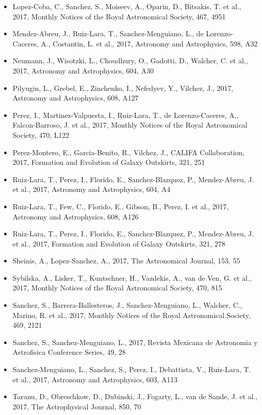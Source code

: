\documentclass{letter}
\begin{document}
\begin{enumerate}
\begin{itemize}
\item Lopez-Coba, C., Sanchez, S., Moiseev, A., Oparin, D., Bitsakis, T. et al., 2017, Monthly Notices of the Royal Astronomical Society, 467, 4951
\item Mendez-Abreu, J., Ruiz-Lara, T., Sanchez-Menguiano, L., de Lorenzo-Caceres, A., Costantin, L. et al., 2017, Astronomy and Astrophysics, 598, A32
\item Neumann, J., Wisotzki, L., Choudhury, O., Gadotti, D., Walcher, C. et al., 2017, Astronomy and Astrophysics, 604, A30
\item Pilyugin, L., Grebel, E., Zinchenko, I., Nefedyev, Y., Vilchez, J., 2017, Astronomy and Astrophysics, 608, A127
\item Perez, I., Martinez-Valpuesta, I., Ruiz-Lara, T., de Lorenzo-Caceres, A., Falcon-Barroso, J. et al., 2017, Monthly Notices of the Royal Astronomical Society, 470, L122
\item Perez-Montero, E., Garcia-Benito, R., Vilchez, J., CALIFA Collaboration, 2017, Formation and Evolution of Galaxy Outskirts, 321, 251
\item Ruiz-Lara, T., Perez, I., Florido, E., Sanchez-Blazquez, P., Mendez-Abreu, J. et al., 2017, Astronomy and Astrophysics, 604, A4
\item Ruiz-Lara, T., Few, C., Florido, E., Gibson, B., Perez, I. et al., 2017, Astronomy and Astrophysics, 608, A126
\item Ruiz-Lara, T., Perez, I., Florido, E., Sanchez-Blazquez, P., Mendez-Abreu, J. et al., 2017, Formation and Evolution of Galaxy Outskirts, 321, 278
\item Sheinis, A., Lopez-Sanchez, A., 2017, The Astronomical Journal, 153, 55
\item Sybilska, A., Lisker, T., Kuntschner, H., Vazdekis, A., van de Ven, G. et al., 2017, Monthly Notices of the Royal Astronomical Society, 470, 815
\item Sanchez, S., Barrera-Ballesteros, J., Sanchez-Menguiano, L., Walcher, C., Marino, R. et al., 2017, Monthly Notices of the Royal Astronomical Society, 469, 2121
\item Sanchez, S., Sanchez-Menguiano, L., 2017, Revista Mexicana de Astronomia y Astrofisica Conference Series, 49, 28
\item Sanchez-Menguiano, L., Sanchez, S., Perez, I., Debattista, V., Ruiz-Lara, T. et al., 2017, Astronomy and Astrophysics, 603, A113
\item Taranu, D., Obreschkow, D., Dubinski, J., Fogarty, L., van de Sande, J. et al., 2017, The Astrophysical Journal, 850, 70

\end{itemize}
\end{enumerate}
\end{document}
